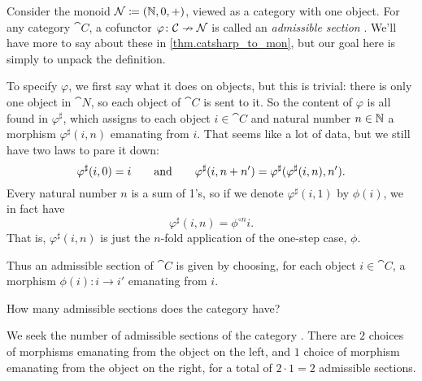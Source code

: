\documentclass[Book-Poly]{subfiles}
\begin{document}
\begin{example}\label{ex.admissible_section}
Consider the monoid $\mathcal{N}\coloneqq (\mathbb{N},0,+)$, viewed as a category with one object. For any category $\cat{C}$, a cofunctor $\varphi\colon\mathcal{C}\nrightarrow\mathcal{N}$ is called an \emph{admissible section} \cite{aguiar1997internal}. We'll have more to say about these in \cref{thm.catsharp_to_mon}, but our goal here is simply to unpack the definition.

To specify $\varphi$, we first say what it does on objects, but this is trivial: there is only one object in $\cat{N}$, so each object of $\cat{C}$ is sent to it. So the content of $\varphi$ is all found in $\varphi^\sharp$, which assigns to each object $i\in\cat{C}$ and natural number $n\in\mathbb{N}$ a morphism $\varphi^\sharp(i,n)$ emanating from $i$. That seems like a lot of data, but we still have two laws to pare it down:
\[
  \varphi^\sharp(i,0)=i
  \qquad\text{and}\qquad
  \varphi^\sharp(i,n+n')=\varphi^\sharp(\varphi^\sharp(i,n),n').
\]
Every natural number $n$ is a sum of 1's, so if we denote $\varphi^\sharp(i,1)$ by $\phi(i)$, we in fact have
\[
\varphi^\sharp(i,n)=\phi^{\circ n}i.
\]
That is, $\varphi^\sharp(i,n)$ is just the $n$-fold application of the one-step case, $\phi$.

Thus an admissible section of $\cat{C}$ is given by choosing, for each object $i\in\cat{C}$, a morphism $\phi(i)\colon i\to i'$ emanating from $i$.
\end{example}

\begin{exercise}
How many admissible sections does the category \fbox{$\bullet\to\bullet$} have?
\begin{solution}
We seek the number of admissible sections of the category \fbox{$\bullet\to\bullet$}.
There are $2$ choices of morphisms emanating from the object on the left, and $1$ choice of morphism emanating from the object on the right, for a total of $2 \cdot 1 = 2$ admissible sections.
\end{solution}
\end{exercise}
\end{document}
